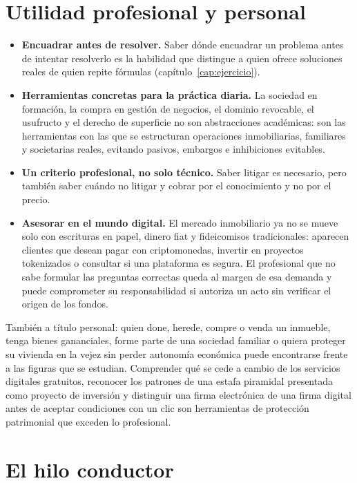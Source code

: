 \documentclass[12pt,oneside]{book}
\begin{document}
\section{Utilidad profesional y personal}

\begin{itemize}
    \item \textbf{Encuadrar antes de resolver.} Saber dónde encuadrar un problema antes de intentar resolverlo es la habilidad que distingue a quien ofrece soluciones reales de quien repite fórmulas (capítulo~\ref{cap:ejercicio}).
    \item \textbf{Herramientas concretas para la práctica diaria.} La sociedad en formación, la compra en gestión de negocios, el dominio revocable, el usufructo y el derecho de superficie no son abstracciones académicas: son las herramientas con las que se estructuran operaciones inmobiliarias, familiares y societarias reales, evitando pasivos, embargos e inhibiciones evitables.
    \item \textbf{Un criterio profesional, no solo técnico.} Saber litigar es necesario, pero también saber cuándo no litigar y cobrar por el conocimiento y no por el precio.
    \item \textbf{Asesorar en el mundo digital.} El mercado inmobiliario ya no se mueve solo con escrituras en papel, dinero fiat y fideicomisos tradicionales: aparecen clientes que desean pagar con criptomonedas, invertir en proyectos tokenizados o consultar si una plataforma es segura. El profesional que no sabe formular las preguntas correctas queda al margen de esa demanda y puede comprometer su responsabilidad si autoriza un acto sin verificar el origen de los fondos.
\end{itemize}

También a título personal: quien done, herede, compre o venda un inmueble, tenga bienes gananciales, forme parte de una sociedad familiar o quiera proteger su vivienda en la vejez sin perder autonomía económica puede encontrarse frente a las figuras que se estudian. Comprender qué se cede a cambio de los servicios digitales gratuitos, reconocer los patrones de una estafa piramidal presentada como proyecto de inversión y distinguir una firma electrónica de una firma digital antes de aceptar condiciones con un clic son herramientas de protección patrimonial que exceden lo profesional.

\section{El hilo conductor}
\end{document}
